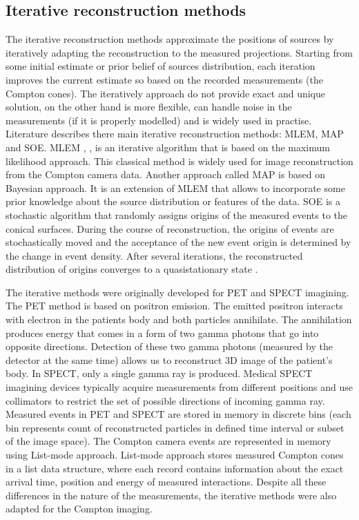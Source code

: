 \subsection{Iterative reconstruction methods}
The iterative reconstruction methods approximate the positions of sources by iteratively adapting the reconstruction to the measured projections.
Starting from some initial estimate or prior belief of sources distribution, each iteration improves the current estimate so based on the recorded measurements (the Compton cones).
The iteratively approach do not provide exact and unique solution, on the other hand is more flexible, can handle noise in the measurements (if it is properly modelled) and is widely used in practise.
Literature describes there main iterative reconstruction methods: \acf{MLEM}, \acf{MAP} and \acf{SOE}.
\ac{MLEM} \cite{MLEM_Shepp_1982}, \cite{MLEM_Lange_Carlson_1984}, \cite{MLEM_Wilderman_2000} is an iterative algorithm that is based on the maximum likelihood approach.
This classical method is widely used for image reconstruction from the Compton camera data. %
Another approach called \ac{MAP} \cite{MLEM_Lange_Carlson_1984} is based on Bayesian approach.
It is an extension of \ac{MLEM} that allows to incorporate some prior knowledge about the source distribution or features of the data.
\ac{SOE} is a stochastic algorithm that randomly assigns origins of the measured events to the conical surfaces.
During the course of reconstruction, the origins of events are stochastically moved and the acceptance of the new event origin is determined by the change in event density.
After several iterations, the reconstructed distribution of origins converges to a quasistationary state \cite{SOE_Andreyev_2009}.

The iterative methods were originally developed for \ac{PET} and \ac{SPECT} imagining.
The \ac{PET}  method is based on positron emission. 
The emitted positron interacts with electron in the patients body and both particles annihilate. 
The annihilation produces energy that comes in a form of two gamma photons that go into opposite directions.
Detection of these two gamma photons (measured by the detector at the same time) allows us to reconstruct 3D image of the patient's body.
In \ac{SPECT}, only a single gamma ray is produced. 
Medical \ac{SPECT} imagining devices typically acquire measurements from different positions and use collimators to restrict the set of possible directions of incoming gamma ray.
Measured events in \ac{PET} and \ac{SPECT} are stored in memory in discrete bins (each bin represents count of reconstructed particles in defined time interval or subset of the image space).
The Compton camera events are represented in memory using List-mode approach.
List-mode approach stores measured Compton cones in a list data structure, where each record contains information about the exact arrival time, position and energy of measured interactions.
Despite all these differences in the nature of the measurements, the iterative methods were also adapted for the Compton imaging.

